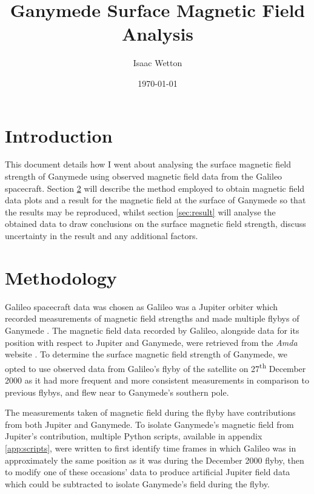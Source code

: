 \documentclass[11pt]{article}
\begin{document}
\title{Ganymede Surface Magnetic Field Analysis}
\author{Isaac Wetton}
\date{\today}
\maketitle

\section{Introduction}
\label{sec:intro}

This document details how I went about analysing the surface magnetic field strength of Ganymede using observed magnetic field data from the Galileo spacecraft. Section \ref{sec:meth} will describe the method employed to obtain magnetic field data plots and a result for the magnetic field at the surface of Ganymede so that the results may be reproduced, whilst section \ref{sec:result} will analyse the obtained data to draw conclusions on the surface magnetic field strength, discuss uncertainty in the result and any additional factors.

\section{Methodology}
\label{sec:meth}

Galileo spacecraft data was chosen as Galileo was a Jupiter orbiter which recorded measurements of magnetic field strengths and made multiple flybys of Ganymede \cite{craft}. The magnetic field data recorded by Galileo, alongside data for its position with respect to Jupiter and Ganymede, were retrieved from the \emph{Amda} website \cite{amda}. To determine the surface magnetic field strength of Ganymede, we opted to use observed data from Galileo's flyby of the satellite on 27\textsuperscript{th} December 2000 \cite{nasaflybys} as it had more frequent and more consistent measurements in comparison to previous flybys, and flew near to Ganymede's southern pole.

The measurements taken of magnetic field during the flyby have contributions from both Jupiter and Ganymede. To isolate Ganymede's magnetic field from Jupiter's contribution, multiple Python scripts, available in appendix \ref{app:scripts}, were written to first identify time frames in which Galileo was in approximately the same position as it was during the December 2000 flyby, then to modify one of these occasions' data to produce artificial Jupiter field data which could be subtracted to isolate Ganymede's field during the flyby.
\end{document}
